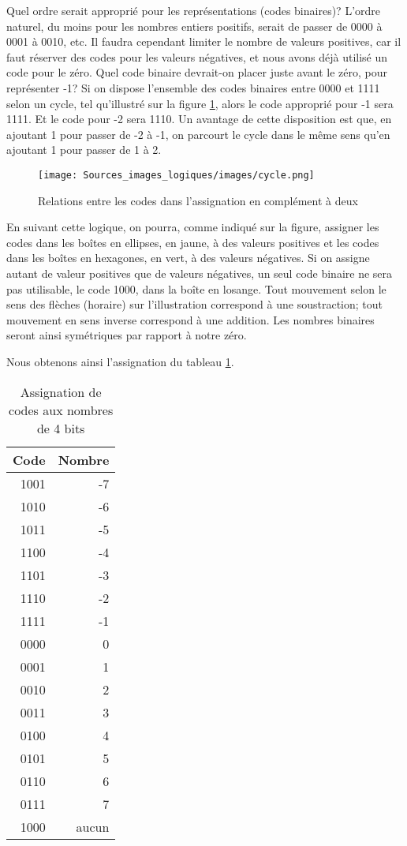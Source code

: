 \documentclass[11pt]{article}
\begin{document}
Quel ordre serait approprié pour les représentations (codes binaires)?
L'ordre naturel, du moins pour les nombres entiers positifs, serait de
passer de 0000 à 0001 à 0010, etc. Il faudra cependant limiter le
nombre de valeurs positives, car il faut réserver des codes pour les
valeurs négatives, et nous avons déjà utilisé un code pour le
zéro. Quel code binaire devrait-on placer juste avant le zéro, pour
représenter -1? Si on dispose l'ensemble des codes binaires entre 0000
et 1111 selon un cycle, tel qu'illustré sur la figure
\ref{fig:org607c456}, alors le code approprié pour -1 sera 1111. Et le
code pour -2 sera 1110. Un avantage de cette disposition est que, en
ajoutant 1 pour passer de -2 à -1, on parcourt le cycle dans le même
sens qu'en ajoutant 1 pour passer de 1 à 2.

\begin{figure}[htbp]
\centering
\texttt{[image: Sources\_images\_logiques/images/cycle.png]}
\caption{\label{fig:org607c456}Relations entre les codes dans l'assignation en complément à deux}
\end{figure}

En suivant cette logique, on pourra, comme indiqué sur la figure,
assigner les codes dans les boîtes en ellipses, en jaune, à des
valeurs positives et les codes dans les boîtes en hexagones, en vert,
à des valeurs négatives. Si on assigne autant de valeur positives que
de valeurs négatives, un seul code binaire ne sera pas utilisable, le
code 1000, dans la boîte en losange. Tout mouvement selon le sens des
flèches (horaire) sur l'illustration correspond à une soustraction;
tout mouvement en sens inverse correspond à une addition. Les nombres
binaires seront ainsi symétriques par rapport à notre zéro.

Nous obtenons ainsi l'assignation du tableau \ref{tab:org67fc428}.

\begin{table}[htbp]
\caption{\label{tab:org67fc428}Assignation de codes aux nombres de 4 bits}
\centering
\begin{tabular}{rr}
Code & Nombre\\
\hline
1001 & -7\\
1010 & -6\\
1011 & -5\\
1100 & -4\\
1101 & -3\\
1110 & -2\\
1111 & -1\\
0000 & 0\\
0001 & 1\\
0010 & 2\\
0011 & 3\\
0100 & 4\\
0101 & 5\\
0110 & 6\\
0111 & 7\\
1000 & aucun\\
\end{tabular}
\end{table}
\end{document}
